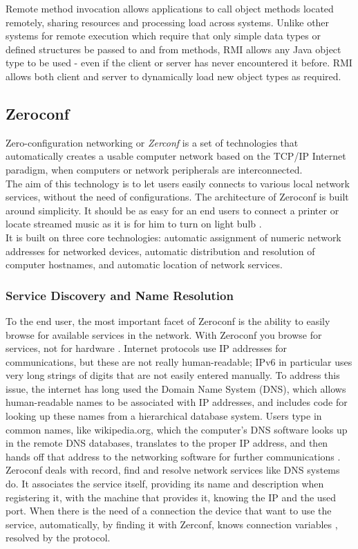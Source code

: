 Remote method invocation allows applications to call object methods located remotely, sharing resources and processing load across systems. Unlike other systems for remote execution which require that only simple data types or defined structures be passed to and from methods, RMI allows any Java object type to be used - even if the client or server has never encountered it before. RMI allows both client and server to dynamically load new object types as required.
\subsection{Zeroconf}\label{zeroconf} Zero-configuration networking or \textit{Zerconf} is a set of technologies that automatically creates a usable computer network based on the TCP/IP Internet paradigm, when computers or network peripherals are interconnected. \\
The aim of this technology is to let users easily connects to various local network services, without the need of configurations. The architecture of Zeroconf is built around simplicity. It should be as easy for an end users to connect a printer or locate streamed music as it is for him to turn on light bulb \cite{cheshire2006zero}.\\
It is built on three core technologies: automatic assignment of numeric network addresses for networked devices, automatic distribution and resolution of computer hostnames, and automatic location of network services.\\

\subsubsection{Service Discovery and Name Resolution}
To the end user, the most important facet of Zeroconf is the ability to easily browse for available services in the network. With Zeroconf you browse for services, not for hardware \cite{cheshire2006zero}. Internet protocols use IP addresses for communications, but these are not really human-readable; IPv6 in particular uses very long strings of digits that are not easily entered manually. To address this issue, the internet has long used the Domain Name System (DNS), which allows human-readable names to be associated with IP addresses, and includes code for looking up these names from a hierarchical database system. Users type in common names, like wikipedia.org, which the computer's DNS software looks up in the remote DNS databases, translates to the proper IP address, and then hands off that address to the networking software for further communications \cite{marshall2011how}. Zeroconf deals with record, find and resolve network services like DNS systems do. It associates the service itself, providing its name and description when registering it, with the machine that provides it, knowing the IP and the used port. When there is the need of a connection the device that want to use the service, automatically, by finding it with Zerconf, knows connection variables , resolved by the protocol.
